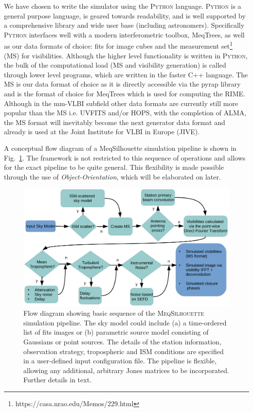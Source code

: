 We have chosen to write the simulator using the \textsc{Python} language. \textsc{Python} is a general purpose language, is geared towards readability, and is well supported by a comprehensive library and wide user base (including astronomers). Specifically \textsc{Python} interfaces well with a modern interferometric toolbox, {\sc MeqTrees}, as well as our data formats of choice: {\sc fits} for image cubes and the {\sc measurement set}\footnote{https://casa.nrao.edu/Memos/229.html} (MS) for visibilities. Although the higher level functionality is written in \textsc{Python}, the bulk of the computational load (MS and visibility generation) is called through lower level programs, which are written in the faster {\sc C++} language. 
The MS is our data format of choice as it is directly accessible via the {\sc pyrap} library and is the format of choice for {\sc MeqTrees} which is used for computing the RIME. Although in the mm-VLBI subfield other data formats are currently still more popular than the MS i.e. {\sc UVFITS} and/or {\sc HOPS}, with the completion of ALMA, the MS format will inevitably become the next generator data format and already is used at the Joint Institute for VLBI in Europe (JIVE). 



A conceptual flow diagram of a {\sc MeqSilhouette} simulation pipeline is shown in Fig.~\ref{flow}. The framework is not restricted to this sequence of operations and allows for the exact pipeline to be quite general. This flexibility is made possible through the use of \emph{Object-Orientation}, which will be elaborated on later.

\begin{figure}
\begin{center}
\includegraphics[width=\columnwidth]{Images/flow_full}
\caption{Flow diagram showing basic sequence of the \textsc{MeqSilhouette} simulation pipeline. The sky model could include (a) a time-ordered list of {\sc fits} images or (b) parametric source model consisting of Gaussians or point sources. The details of the station information, observation strategy, tropospheric and ISM conditions are specified in a user-defined input configuration file. The pipeline is flexible, allowing any additional, arbitrary Jones matrices to be incorporated. Further details in text.\label{flow}%
}
\end{center}
\end{figure}


